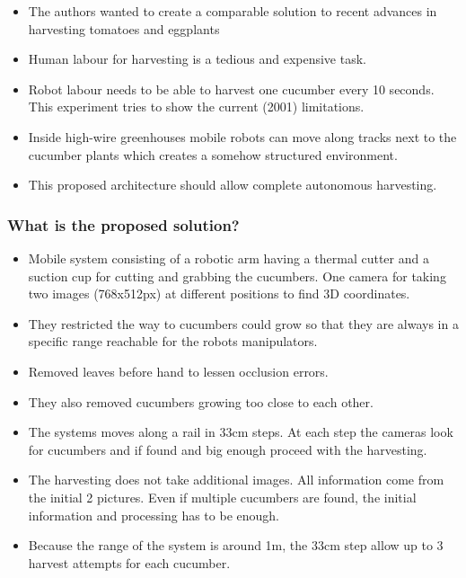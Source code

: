     \begin{itemize}
        \item The authors wanted to create a comparable solution to recent advances in harvesting tomatoes and eggplants
        \item Human labour for harvesting is a tedious and expensive task.
        \item Robot labour needs to be able to harvest one cucumber every 10 seconds. This experiment tries to show the current (2001) limitations.
        \item Inside high-wire greenhouses mobile robots can move along tracks next to the cucumber plants which creates a somehow structured environment.
        \item This proposed architecture should allow complete autonomous harvesting.
    \end{itemize}
    \subsubsection*{What is the proposed solution?}
    \begin{itemize}
        \item Mobile system consisting of a robotic arm having a thermal cutter and a suction cup for cutting and grabbing the cucumbers. One camera for taking two
        images (768x512px) at different positions to find 3D coordinates.
        \item They restricted the way to cucumbers could grow so that they are always in a specific range reachable for the robots manipulators.
        \item Removed leaves before hand to lessen occlusion errors.
        \item They also removed cucumbers growing too close to each other.
        \item The systems moves along a rail in 33cm steps. At each step the cameras look for cucumbers and if found and big enough proceed with the harvesting.
        \item The harvesting does not take additional images. All information come from the initial 2 pictures. Even if multiple cucumbers are found, the initial information and processing has to be enough.
        \item Because the range of the system is around 1m, the 33cm step allow up to 3 harvest attempts for each cucumber.
    \end{itemize}
